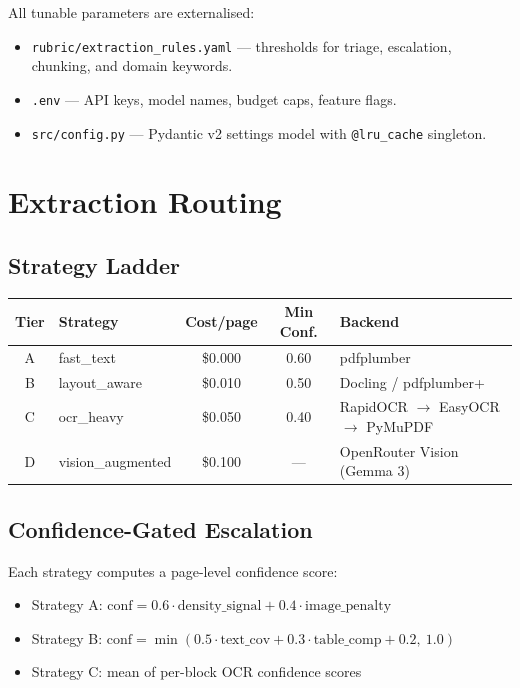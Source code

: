 \documentclass[12pt,a4paper]{article}
\begin{document}
All tunable parameters are externalised:

\begin{itemize}[nosep]
    \item \texttt{rubric/extraction\_rules.yaml} — thresholds for triage,
          escalation, chunking, and domain keywords.
    \item \texttt{.env} — API keys, model names, budget caps, feature flags.
    \item \texttt{src/config.py} — Pydantic v2 settings model with
          \texttt{@lru\_cache} singleton.
\end{itemize}


\section{Extraction Routing}

\subsection{Strategy Ladder}

\begin{center}
\begin{tabular}{clccl}
\toprule
\textbf{Tier} & \textbf{Strategy} & \textbf{Cost/page} & \textbf{Min Conf.} & \textbf{Backend} \\
\midrule
A & fast\_text       & \$0.000 & 0.60 & pdfplumber \\
B & layout\_aware    & \$0.010 & 0.50 & Docling / pdfplumber+ \\
C & ocr\_heavy       & \$0.050 & 0.40 & RapidOCR $\to$ EasyOCR $\to$ PyMuPDF \\
D & vision\_augmented & \$0.100 & —    & OpenRouter Vision (Gemma 3) \\
\bottomrule
\end{tabular}
\end{center}

\subsection{Confidence-Gated Escalation}

Each strategy computes a page-level confidence score:

\begin{itemize}[nosep]
    \item Strategy A: $\text{conf} = 0.6 \cdot \text{density\_signal} +
          0.4 \cdot \text{image\_penalty}$
    \item Strategy B: $\text{conf} = \min(0.5 \cdot \text{text\_cov} +
          0.3 \cdot \text{table\_comp} + 0.2,\ 1.0)$
    \item Strategy C: mean of per-block OCR confidence scores
\end{itemize}
\end{document}
